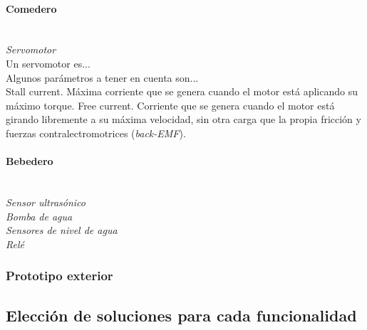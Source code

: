 \documentclass[12pt]{article}
\newcommand{\subsubsubsection}[1]{\paragraph{#1}\mbox{}\\}
\begin{document}
	\pagebreak
	
	\subsubsubsection{Comedero}
	
	\noindent \textit{Servomotor} \\
	
	\noindent Un servomotor es... \\
	
	\noindent Algunos parámetros a tener en cuenta son... \\
	\noindent Stall current. Máxima corriente que se genera cuando el motor está aplicando su máximo torque. Free current. Corriente que se genera cuando el motor está girando libremente a su máxima velocidad, sin otra carga que la propia fricción y fuerzas contralectromotrices (\textit{back-EMF}). \\
	
	\pagebreak
	
	\subsubsubsection{Bebedero}
	
	\noindent \textit{Sensor ultrasónico}\\
	
	\noindent \textit{Bomba de agua} \\
	
	\noindent \textit{Sensores de nivel de agua} \\
	
	\noindent \textit{Relé} \\
	
	\pagebreak
	
	\subsubsection{Prototipo exterior}

	\pagebreak
	
	\subsection[Elección soluciones]{Elección de soluciones para cada funcionalidad}
	\label{Subsección 3.3: elección de soluciones para cada funcionalidad}
	
\end{document}

